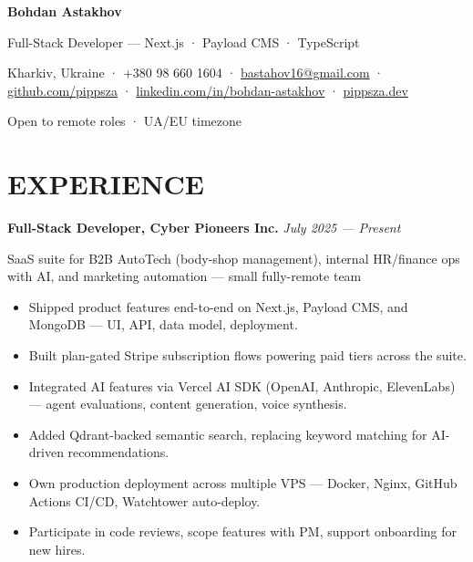 \documentclass[10pt,a4paper]{article}
\begin{document}
{\Huge\bfseries\color{accent}Bohdan Astakhov}\par
\vspace{4pt}
{\large Full-Stack Developer — Next.js · Payload CMS · TypeScript}\par
\vspace{10pt}
Kharkiv, Ukraine · +380 98 660 1604 · \href{mailto:bastahov16@gmail.com}{bastahov16@gmail.com} · \href{https://github.com/pippsza}{github.com/pippsza} · \href{https://www.linkedin.com/in/bohdan-astakhov-36a95a349/}{linkedin.com/in/bohdan-astakhov} · \href{https://pippsza.dev}{pippsza.dev}\par
\vspace{4pt}
{\color{midgray}Open to remote roles · UA/EU timezone}

\section*{EXPERIENCE}

{\bfseries Full-Stack Developer, Cyber Pioneers Inc.} \hfill {\itshape July 2025 — Present}\par
{\color{midgray}\small SaaS suite for B2B AutoTech (body-shop management), internal HR/finance ops with AI, and marketing automation — small fully-remote team}
\begin{itemize}
  \item Shipped product features end-to-end on Next.js, Payload CMS, and MongoDB — UI, API, data model, deployment.
  \item Built plan-gated Stripe subscription flows powering paid tiers across the suite.
  \item Integrated AI features via Vercel AI SDK (OpenAI, Anthropic, ElevenLabs) — agent evaluations, content generation, voice synthesis.
  \item Added Qdrant-backed semantic search, replacing keyword matching for AI-driven recommendations.
  \item Own production deployment across multiple VPS — Docker, Nginx, GitHub Actions CI/CD, Watchtower auto-deploy.
  \item Participate in code reviews, scope features with PM, support onboarding for new hires.
\end{itemize}
\end{document}
